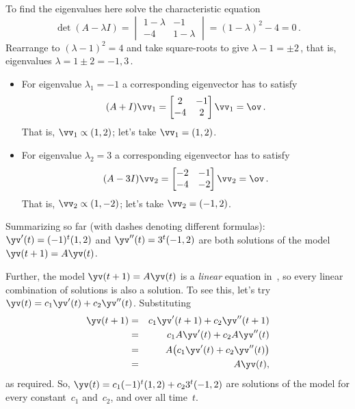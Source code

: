 \begin{example}
\begin{solution}
To find the eigenvalues here solve the characteristic equation 
\begin{equation*}
\det(A-\lambda I)=\begin{vmatrix} 1-\lambda&-1\\-4&1-\lambda \end{vmatrix}=(1-\lambda)^2-4=0\,.
\end{equation*}
Rearrange to \((\lambda-1)^2=4\) and take square-roots to give \(\lambda-1=\pm2\)\,, that is, eigenvalues \(\lambda=1\pm2=-1,3\)\,.
\begin{itemize}
\item For eigenvalue \(\lambda_1=-1\) a corresponding eigenvector has to satisfy
\begin{equation*}
(A+I)\vv_1=\begin{bmatrix} 2&-1\\-4&2 \end{bmatrix}\vv_1=\ov\,.
\end{equation*}
That is, \(\vv_1\propto (1,2)\); let's take \(\vv_1=(1,2)\).

\item For eigenvalue \(\lambda_2=3\) a corresponding eigenvector has to satisfy
\begin{equation*}
(A-3I)\vv_2=\begin{bmatrix} -2&-1\\-4&-2 \end{bmatrix}\vv_2=\ov\,.
\end{equation*}
That is, \(\vv_2\propto (1,-2)\); let's take \(\vv_2=(-1,2)\).
\end{itemize}
Summarizing so far (with dashes denoting different formulas): \(\yv'(t)=(-1)^t(1,2)\) and \(\yv''(t)=3^t(-1,2)\) are both solutions of the model \(\yv(t+1)=A\yv(t)\).

Further, the model \(\yv(t+1)=A\yv(t)\) is a \emph{linear} equation in~\yv, so every linear combination of solutions is also a solution.
To see this, let's try \(\yv(t)=c_1\yv'(t)+c_2\yv''(t)\).
Substituting
\begin{eqnarray*}
\yv(t+1)&=&c_1\yv'(t+1)+c_2\yv''(t+1)
\\&=&c_1A\yv'(t)+c_2A\yv''(t)
\\&=&A\big(c_1\yv'(t)+c_2\yv''(t)\big)
\\&=&A\yv(t),
\end{eqnarray*}
as required.
So, \(\yv(t)=c_1(-1)^t(1,2)+c_23^t(-1,2)\) are solutions of the model for every constant~\(c_1\) and~\(c_2\), and over all time~\(t\).


\end{solution}
\end{example}
